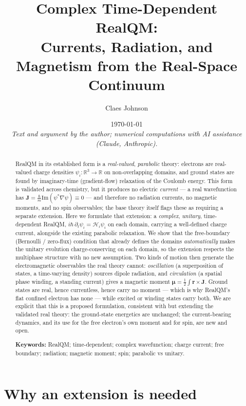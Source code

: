 \documentclass[11pt]{article}
\title{Complex Time-Dependent RealQM:\\
Currents, Radiation, and Magnetism from the Real-Space Continuum}
\author[1]{Claes Johnson}
\affil[1]{KTH Royal Institute of Technology, SE-100 44 Stockholm, Sweden \\
\texttt{claesjohnson@gmail.com}}
\date{\today \\[0.4em]
\small\textit{Text and argument by the author; numerical computations with AI assistance (Claude, Anthropic).}}
\begin{document}
\maketitle

\begin{abstract}
RealQM in its established form is a \emph{real-valued}, \emph{parabolic} theory: electrons are
real-valued charge densities $\psi_i:\mathbb R^3\to\mathbb R$ on non-overlapping domains, and ground
states are found by imaginary-time (gradient-flow) relaxation of the Coulomb energy. This form is
validated across chemistry, but it produces no electric \emph{current} --- a real wavefunction has
$\mathbf J=\frac{\hbar}{m}\mathrm{Im}(\psi^*\nabla\psi)\equiv 0$ --- and therefore no radiation currents,
no magnetic moments, and no spin observables; the base theory itself flags these as requiring a separate
extension. Here we formulate that extension: a \emph{complex}, \emph{unitary}, time-dependent RealQM,
$i\hbar\,\partial_t\psi_i = \mathcal H_i\psi_i$ on each domain, carrying a well-defined charge current,
alongside the existing parabolic relaxation. We show that the free-boundary (Bernoulli / zero-flux)
condition that already defines the domains \emph{automatically} makes the unitary evolution
charge-conserving on each domain, so the extension respects the multiphase structure with no new
assumption. Two kinds of motion then generate the electromagnetic observables the real theory cannot:
\emph{oscillation} (a superposition of states, a time-varying density) sources dipole radiation, and
\emph{circulation} (a spatial phase winding, a standing current) gives a magnetic moment
$\boldsymbol\mu=\tfrac12\int\mathbf r\times\mathbf J$. Ground states are real, hence currentless, hence
carry no moment --- which is why RealQM's flat confined electron has none --- while excited or winding
states carry both. We are explicit that this is a proposed formulation, consistent with but extending the
validated real theory: the ground-state energetics are unchanged; the current-bearing dynamics, and its
use for the free electron's own moment and for spin, are new and open.

\medskip
\noindent\textbf{Keywords:} RealQM; time-dependent; complex wavefunction; charge current; free boundary;
radiation; magnetic moment; spin; parabolic vs unitary.
\end{abstract}


\section{Why an extension is needed}
\label{sec:why}
\end{document}
